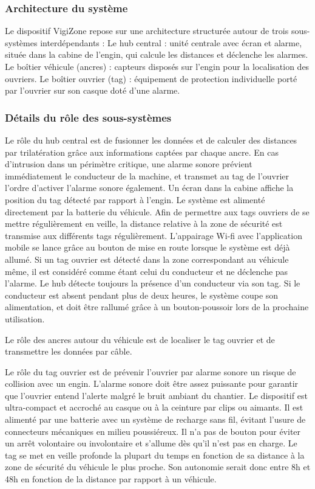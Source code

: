 \subsubsection{Architecture du système}
Le dispositif VigiZone repose sur une architecture structurée autour de trois sous-systèmes interdépendants :
Le hub central : unité centrale avec écran et alarme, située dans la cabine de l'engin, qui calcule les distances et déclenche les alarmes.
Le boîtier véhicule (ancres) : capteurs disposés sur l'engin pour la localisation des ouvriers.
Le boîtier ouvrier (tag) : équipement de protection individuelle porté par l'ouvrier sur son casque doté d’une alarme.

\subsubsection{Détails du rôle des sous-systèmes}

Le rôle du hub central est de fusionner les données et de calculer des distances par trilatération grâce aux informations captées par chaque ancre. En cas d'intrusion dans un périmètre critique, une alarme sonore prévient immédiatement le conducteur de la machine, et transmet au tag de l’ouvrier l’ordre d’activer l’alarme sonore également. 
Un écran dans la cabine affiche la position du tag détecté par rapport à l’engin. Le système est alimenté directement par la batterie du véhicule. Afin de permettre aux tags ouvriers de se mettre régulièrement en veille, la distance relative à la zone de sécurité est transmise aux différents tags régulièrement. L’appairage Wi-fi avec l’application mobile se lance grâce au bouton de mise en route lorsque le système est déjà allumé. 
Si un tag ouvrier est détecté dans la zone correspondant au véhicule même, il est considéré comme étant celui du conducteur et ne déclenche pas l’alarme. Le hub détecte toujours la présence d’un conducteur via son tag. Si le conducteur est absent pendant plus de deux heures, le système coupe son alimentation, et doit être rallumé grâce à un bouton-poussoir lors de la prochaine utilisation.

Le rôle des ancres autour du véhicule est de localiser le tag ouvrier et de transmettre les données par câble.

Le rôle du tag ouvrier est de prévenir l’ouvrier par alarme sonore un risque de collision avec un engin. L’alarme sonore doit être assez puissante pour garantir que l'ouvrier entend l'alerte malgré le bruit ambiant du chantier. Le dispositif est ultra-compact et accroché au casque ou à la ceinture par clips ou aimants. Il est alimenté par une batterie avec un système de recharge sans fil, évitant l'usure de connecteurs mécaniques en milieu poussiéreux. Il n’a pas de bouton pour éviter un arrêt volontaire ou involontaire et s’allume dès qu’il n’est pas en charge. Le tag se met en veille profonde la plupart du temps en fonction de sa distance à la zone de sécurité du véhicule le plus proche. Son autonomie serait donc entre 8h et 48h en fonction de la distance par rapport à un véhicule.

